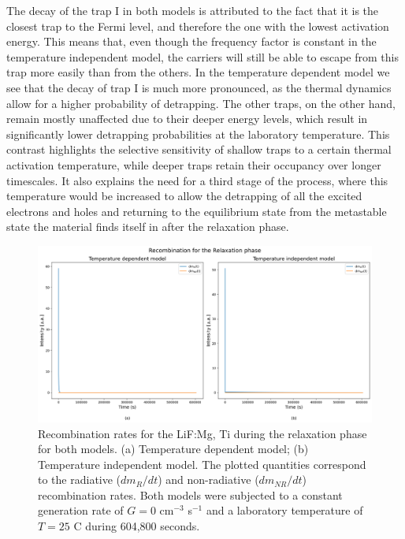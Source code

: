 The decay of the trap I in both models is attributed to the fact that it is the closest trap to the Fermi level, and therefore the one with the lowest activation energy. This means that, even though the frequency factor is constant in the temperature independent model, the carriers will still be able to escape from this trap more easily than from the others. In the temperature dependent model we see that the decay of trap I is much more pronounced, as the thermal dynamics allow for a higher probability of detrapping. The other traps, on the other hand, remain mostly unaffected due to their deeper energy levels, which result in significantly lower detrapping probabilities at the laboratory temperature. This contrast highlights the selective sensitivity of shallow traps to a certain thermal activation temperature, while deeper traps retain their occupancy over longer timescales. It also explains the need for a third stage of the process, where this temperature would be increased to allow the detrapping of all the excited electrons and holes and returning to the equilibrium state from the metastable state the material finds itself in after the relaxation phase.

\begin{figure}
    \centering
    \includegraphics[width=\textwidth]{Images/Relaxation Recombination.png}
    \caption{Recombination rates for the LiF:Mg, Ti during the relaxation phase for both models. (a) Temperature dependent model; (b) Temperature independent model. The plotted quantities correspond to the radiative ($dm_R/dt$) and non-radiative ($dm_{NR}/dt$) recombination rates. Both models were subjected to a constant generation rate of $G = 0$ cm$^{-3}$ s$^{-1}$ and a laboratory temperature of $T = 25$ \textdegree C during 604,800 seconds.}
    \label{fig:relaxation_recombination}
\end{figure}

